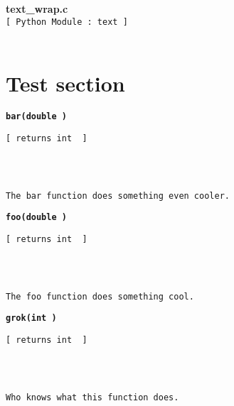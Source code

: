 \setlength{\parindent}{0.0in}
\setlength{\textwidth}{6.5in}
\setlength{\oddsidemargin}{0.0in}
\pagestyle{headings}

{\Large \bf  text\_wrap.c }\\
{\tt [ Python Module : text ]  }\\
\\\section{Test section}{\tt \bf bar(double ) }
\\
\makebox[0.5in]{}\begin{minipage}[t]{6in}
{\small \begin{verbatim}
[ returns int  ]
\end{verbatim}}

\end{minipage}\\

{\small \begin{verbatim}

The bar function does something even cooler.\end{verbatim}}

{\tt \bf foo(double ) }
\\
\makebox[0.5in]{}\begin{minipage}[t]{6in}
{\small \begin{verbatim}
[ returns int  ]
\end{verbatim}}

\end{minipage}\\

{\small \begin{verbatim}

The foo function does something cool.\end{verbatim}}

{\tt \bf grok(int ) }
\\
\makebox[0.5in]{}\begin{minipage}[t]{6in}
{\small \begin{verbatim}
[ returns int  ]
\end{verbatim}}

\end{minipage}\\

{\small \begin{verbatim}

Who knows what this function does.\end{verbatim}}




